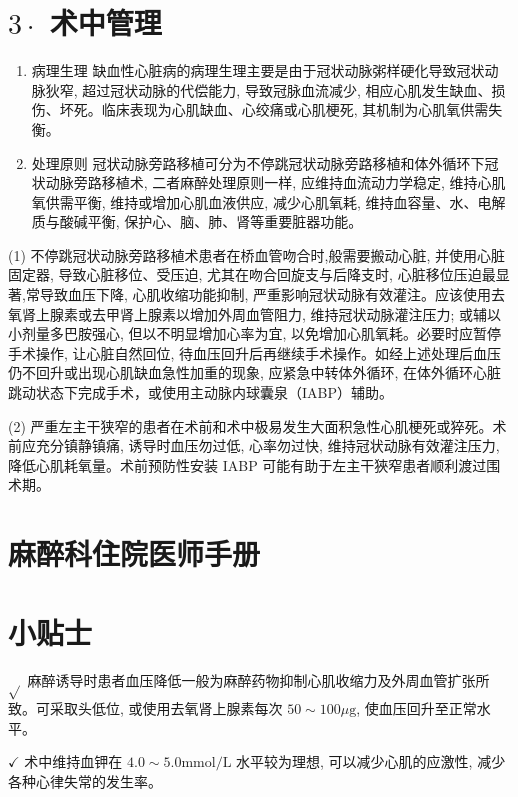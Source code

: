 \documentclass[10pt]{article}
\begin{document}
\section*{$3 \cdot$ 术中管理}
\begin{enumerate}
  \item 病理生理 缺血性心脏病的病理生理主要是由于冠状动脉粥样硬化导致冠状动脉狄窄, 超过冠状动脉的代偿能力, 导致冠脉血流减少, 相应心肌发生缺血、损伤、坏死。临床表现为心肌缺血、心绞痛或心肌梗死, 其机制为心肌氧供需失衡。

  \item 处理原则 冠状动脉旁路移植可分为不停跳冠状动脉旁路移植和体外循环下冠状动脉旁路移植术, 二者麻醉处理原则一样, 应维持血流动力学稳定, 维持心肌氧供需平衡, 维持或增加心肌血液供应, 减少心肌氧耗, 维持血容量、水、电解质与酸碱平衡, 保护心、脑、肺、肾等重要脏器功能。

\end{enumerate}

(1) 不停跳冠状动脉旁路移植术患者在桥血管吻合时,般需要搬动心脏, 并使用心脏固定器, 导致心脏移位、受压迫, 尤其在吻合回旋支与后降支时, 心脏移位压迫最显著,常导致血压下降, 心肌收缩功能抑制, 严重影响冠状动脉有效灌注。应该使用去氧肾上腺素或去甲肾上腺素以增加外周血管阻力, 维持冠状动脉灌注压力; 或辅以小剂量多巴胺强心, 但以不明显增加心率为宜, 以免增加心肌氧耗。必要时应暂停手术操作, 让心脏自然回位, 待血压回升后再继续手术操作。如经上述处理后血压仍不回升或出现心肌缺血急性加重的现象, 应紧急中转体外循环, 在体外循环心脏跳动状态下完成手术，或使用主动脉内球囊泉（IABP）辅助。

(2) 严重左主干狭窄的患者在术前和术中极易发生大面积急性心肌梗死或猝死。术前应充分镇静镇痛, 诱导时血压勿过低, 心率勿过快, 维持冠状动脉有效灌注压力, 降低心肌耗氧量。术前预防性安装 IABP 可能有助于左主干狹窄患者顺利渡过围术期。

\section*{麻醉科住院医师手册}
\section*{小贴士}
$\sqrt{ }$ 麻醉诱导时患者血压降低一般为麻醉药物抑制心肌收缩力及外周血管扩张所致。可采取头低位, 或使用去氧肾上腺素每次 $50 \sim 100 \mu \mathrm{g}$, 使血压回升至正常水平。

$\checkmark$ 术中维持血钾在 $4.0 \sim 5.0 \mathrm{mmol} / \mathrm{L}$ 水平较为理想, 可以减少心肌的应激性, 减少各种心律失常的发生率。
\end{document}
